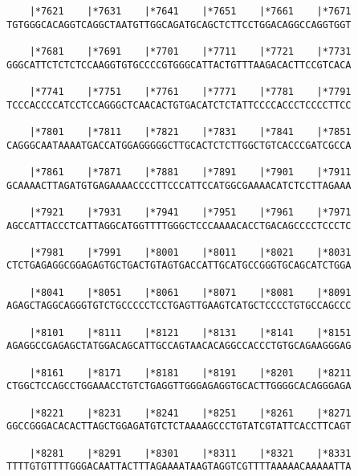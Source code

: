 \documentclass{article}
\begin{document}
\begin{Verbatim}
    |*7621    |*7631    |*7641    |*7651    |*7661    |*7671
TGTGGGCACAGGTCAGGCTAATGTTGGCAGATGCAGCTCTTCCTGGACAGGCCAGGTGGT
                                                            
    |*7681    |*7691    |*7701    |*7711    |*7721    |*7731
GGGCATTCTCTCTCCAAGGTGTGCCCCGTGGGCATTACTGTTTAAGACACTTCCGTCACA
                                                            
    |*7741    |*7751    |*7761    |*7771    |*7781    |*7791
TCCCACCCCATCCTCCAGGGCTCAACACTGTGACATCTCTATTCCCCACCCTCCCCTTCC
                                                            
    |*7801    |*7811    |*7821    |*7831    |*7841    |*7851
CAGGGCAATAAAATGACCATGGAGGGGGCTTGCACTCTCTTGGCTGTCACCCGATCGCCA
                                                            
    |*7861    |*7871    |*7881    |*7891    |*7901    |*7911
GCAAAACTTAGATGTGAGAAAACCCCTTCCCATTCCATGGCGAAAACATCTCCTTAGAAA
                                                            
    |*7921    |*7931    |*7941    |*7951    |*7961    |*7971
AGCCATTACCCTCATTAGGCATGGTTTTGGGCTCCCAAAACACCTGACAGCCCCTCCCTC
                                                            
    |*7981    |*7991    |*8001    |*8011    |*8021    |*8031
CTCTGAGAGGCGGAGAGTGCTGACTGTAGTGACCATTGCATGCCGGGTGCAGCATCTGGA
                                                            
    |*8041    |*8051    |*8061    |*8071    |*8081    |*8091
AGAGCTAGGCAGGGTGTCTGCCCCCTCCTGAGTTGAAGTCATGCTCCCCTGTGCCAGCCC
                                                            
    |*8101    |*8111    |*8121    |*8131    |*8141    |*8151
AGAGGCCGAGAGCTATGGACAGCATTGCCAGTAACACAGGCCACCCTGTGCAGAAGGGAG
                                                            
    |*8161    |*8171    |*8181    |*8191    |*8201    |*8211
CTGGCTCCAGCCTGGAAACCTGTCTGAGGTTGGGAGAGGTGCACTTGGGGCACAGGGAGA
                                                            
    |*8221    |*8231    |*8241    |*8251    |*8261    |*8271
GGCCGGGACACACTTAGCTGGAGATGTCTCTAAAAGCCCTGTATCGTATTCACCTTCAGT
                                                            
    |*8281    |*8291    |*8301    |*8311    |*8321    |*8331
TTTTGTGTTTTGGGACAATTACTTTAGAAAATAAGTAGGTCGTTTTAAAAACAAAAATTA
                                                            

\end{Verbatim}
\end{document}
